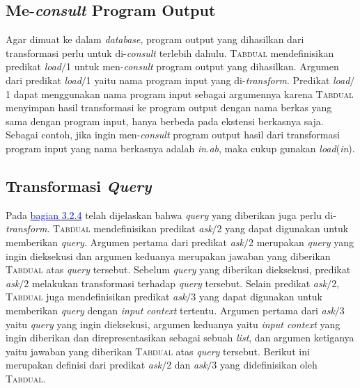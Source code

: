 \subsection{Me-\textit{consult} Program Output}

Agar dimuat ke dalam \textit{database}, program output yang dihasilkan dari transformasi perlu untuk di-\textit{consult} terlebih dahulu. \textsc{Tabdual} mendefinisikan predikat \textit{load$/$}1 untuk men-\textit{consult} program output yang dihasilkan. Argumen dari predikat \textit{load$/$}1 yaitu nama program input yang di-\textit{transform}. Predikat \textit{load$/$}1 dapat menggunakan nama program input sebagai argumennya karena \textsc{Tabdual} menyimpan hasil transformasi ke program output dengan nama berkas yang sama dengan program input, hanya berbeda pada ekstensi berkasnya saja. Sebagai contoh, jika ingin men-\textit{consult} program output hasil dari transformasi program input yang nama berkasnya adalah \textit{in.ab}, maka cukup gunakan \textit{load}(\textit{in}).

\subsection{Transformasi \textit{Query}}

Pada \hyperref[transquery]{\textcolor{blue}{bagian 3.2.4}} telah dijelaskan bahwa \textit{query} yang diberikan juga perlu di-\textit{transform}. \textsc{Tabdual} mendefinisikan predikat \textit{ask$/$}2 yang dapat digunakan untuk memberikan \textit{query}. Argumen pertama dari predikat \textit{ask$/$}2 merupakan \textit{query} yang ingin dieksekusi dan argumen keduanya merupakan jawaban yang diberikan \textsc{Tabdual} atas \textit{query} tersebut. Sebelum \textit{query} yang diberikan dieksekusi, predikat \textit{ask$/$}2 melakukan transformasi terhadap \textit{query} tersebut. Selain predikat \textit{ask$/$}2, \textsc{Tabdual} juga mendefinisikan predikat \textit{ask$/$}3 yang dapat digunakan untuk memberikan \textit{query} dengan \textit{input context} tertentu. Argumen pertama dari \textit{ask$/$}3 yaitu \textit{query} yang ingin dieksekusi, argumen keduanya yaitu \textit{input context} yang ingin diberikan dan direpresentasikan sebagai sebuah \textit{list}, dan argumen ketiganya yaitu jawaban yang diberikan \textsc{Tabdual} atas \textit{query} tersebut. Berikut ini merupakan definisi dari predikat \textit{ask$/$}2 dan \textit{ask$/$}3 yang didefinisikan oleh \textsc{Tabdual}.
\\

